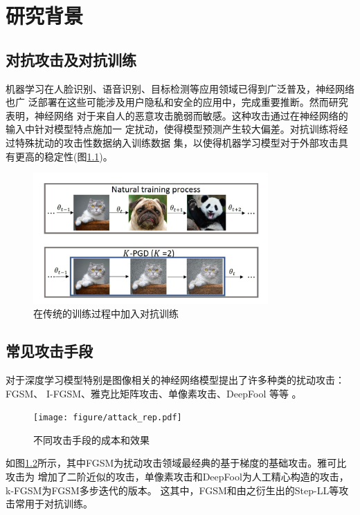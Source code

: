 \chapter{研究背景}
\section{对抗攻击及对抗训练}
机器学习在人脸识别、语音识别、目标检测等应用领域已得到广泛普及，神经网络也广
泛部署在这些可能涉及用户隐私和安全的应用中，完成重要推断。然而研究表明，神经网络
对于来自人的恶意攻击脆弱而敏感\cite{DBLP:journals/corr/SzegedyZSBEGF13}。这种攻击通过在神经网络的输入中针对模型特点施加一
定扰动，使得模型预测产生较大偏差。对抗训练将经过特殊扰动的攻击性数据纳入训练数据
集，以使得机器学习模型对于外部攻击具有更高的稳定性(图\ref{fig:adv_train})。
\begin{figure}[htbp]
    \centering
    \includegraphics[width=0.8\textwidth]{figure/adv_train.png}
    \caption{在传统的训练过程中加入对抗训练}
    \label{fig:adv_train}
\end{figure}

\section{常见攻击手段}
对于深度学习模型特别是图像相关的神经网络模型提出了许多种类的扰动攻击：FGSM、
I-FGSM、雅克比矩阵攻击、单像素攻击、DeepFool 等等 \cite{DBLP:conf/iclr/LiuCLS17} \cite{DBLP:conf/iclr/KurakinGB17}。
\begin{figure}[htbp]
    \centering
    \texttt{[image: figure/attack\_rep.pdf]}
    \caption{不同攻击手段的成本和效果}
    \label{fig:attack_rep}
\end{figure}

如图\ref{fig:attack_rep}所示，其中FGSM为扰动攻击领域最经典的基于梯度的基础攻击。雅可比攻击为
增加了二阶近似的攻击，单像素攻击和DeepFool为人工精心构造的攻击，k-FGSM为FGSM多步迭代的版本。
这其中，FGSM和由之衍生出的Step-LL等攻击常用于对抗训练。

